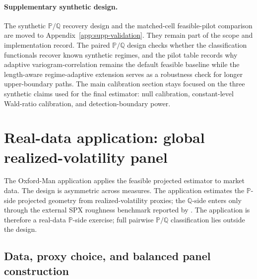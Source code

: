 \documentclass[11pt,a4paper]{amsart}
\theoremstyle{plain}
\theoremstyle{definition}
\theoremstyle{remark}
\newcommand{\PP}{\mathbb{P}}
\newcommand{\QQ}{\mathbb{Q}}
\begin{document}
\paragraph{Supplementary synthetic design.}
The synthetic \(\PP/\QQ\) recovery design and the matched-cell feasible-pilot comparison are moved
to Appendix~\ref{app:supp-validation}.  They remain part of the scope and implementation record.
The paired \(\PP/\QQ\) design checks whether the classification functionals recover known synthetic
regimes, and the pilot table records why adaptive variogram-correlation remains the default feasible
baseline while the length-aware regime-adaptive extension serves as a robustness check for longer
upper-boundary paths.  The main calibration section stays focused on the three synthetic claims
used for the final estimator: null calibration, constant-level Wald-ratio calibration, and
detection-boundary power.

\section{Real-data application: global realized-volatility panel}\label{sec:real-data-application}

The Oxford-Man application applies the feasible projected estimator to market data.  The design is
asymmetric across measures.  The application estimates the \(\PP\)-side projected geometry from
realized-volatility proxies; the \(\QQ\)-side enters only through the external SPX roughness
benchmark reported by \cite{livieri2018rough}.  The application is therefore a real-data
\(\PP\)-side exercise; full pairwise \(\PP/\QQ\) classification lies outside the design.

\subsection{Data, proxy choice, and balanced panel construction}
\end{document}
